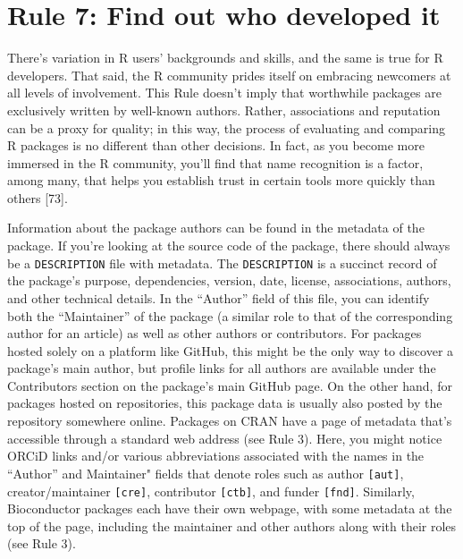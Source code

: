 \documentclass[10pt,letterpaper]{article}
\begin{document}
\hypertarget{rule-7-find-out-who-developed-it}{%
\section{Rule 7: Find out who developed
it}\label{rule-7-find-out-who-developed-it}}

There's variation in R users' backgrounds and skills, and the same is
true for R developers. That said, the R community prides itself on
embracing newcomers at all levels of involvement. This Rule doesn't
imply that worthwhile packages are exclusively written by well-known
authors. Rather, associations and reputation can be a proxy for quality;
in this way, the process of evaluating and comparing R packages is no
different than other decisions. In fact, as you become more immersed in
the R community, you'll find that name recognition is a factor, among
many, that helps you establish trust in certain tools more quickly than
others {[}73{]}.

Information about the package authors can be found in the metadata of
the package. If you're looking at the source code of the package, there
should always be a \texttt{DESCRIPTION} file with metadata. The
\texttt{DESCRIPTION} is a succinct record of the package's purpose,
dependencies, version, date, license, associations, authors, and other
technical details. In the ``Author'' field of this file, you can
identify both the ``Maintainer'' of the package (a similar role to that
of the corresponding author for an article) as well as other authors or
contributors. For packages hosted solely on a platform like GitHub, this
might be the only way to discover a package's main author, but profile
links for all authors are available under the Contributors section on
the package's main GitHub page. On the other hand, for packages hosted
on repositories, this package data is usually also posted by the
repository somewhere online. Packages on CRAN have a page of metadata
that's accessible through a standard web address (see Rule 3). Here, you
might notice ORCiD links and/or various abbreviations associated with
the names in the ``Author'' and Maintainer" fields that denote roles
such as author \texttt{{[}aut{]}}, creator/maintainer
\texttt{{[}cre{]}}, contributor \texttt{{[}ctb{]}}, and funder
\texttt{{[}fnd{]}}. Similarly, Bioconductor packages each have their own
webpage, with some metadata at the top of the page, including the
maintainer and other authors along with their roles (see Rule 3).
\end{document}
